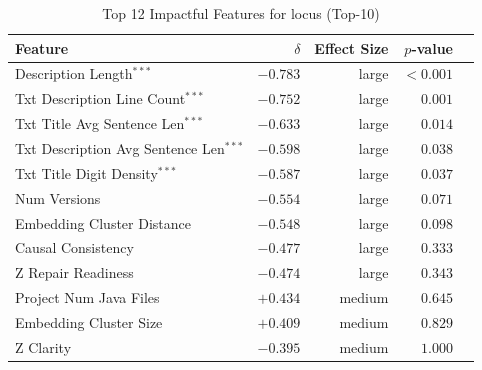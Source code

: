 \begin{table}[h]
\centering
\caption{Top 12 Impactful Features for locus (Top-10)}
\label{tab:tool_features_locus_top10}
\begin{tabular}{lrrrr}
\toprule
Feature & $\delta$ & Effect Size & $p$-value \\
\midrule
Description Length$^{***}$ & $-0.783$ & large & $<0.001$ \\
Txt Description Line Count$^{***}$ & $-0.752$ & large & $0.001$ \\
Txt Title Avg Sentence Len$^{***}$ & $-0.633$ & large & $0.014$ \\
Txt Description Avg Sentence Len$^{***}$ & $-0.598$ & large & $0.038$ \\
Txt Title Digit Density$^{***}$ & $-0.587$ & large & $0.037$ \\
Num Versions & $-0.554$ & large & $0.071$ \\
Embedding Cluster Distance & $-0.548$ & large & $0.098$ \\
Causal Consistency & $-0.477$ & large & $0.333$ \\
Z Repair Readiness & $-0.474$ & large & $0.343$ \\
Project Num Java Files & $+0.434$ & medium & $0.645$ \\
Embedding Cluster Size & $+0.409$ & medium & $0.829$ \\
Z Clarity & $-0.395$ & medium & $1.000$ \\
\bottomrule
\end{tabular}
\end{table}
